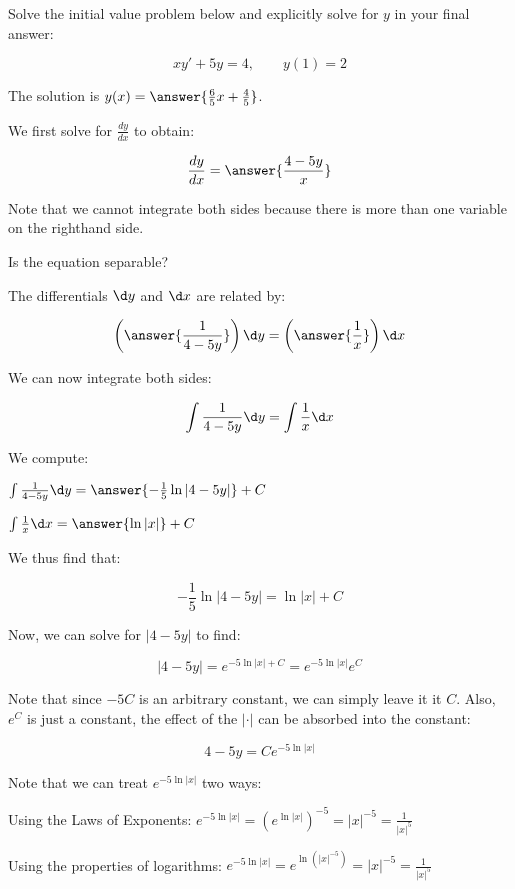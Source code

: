 \documentclass{ximera}
\author{Jim Talamo}
\begin{document}
\begin{exercise}
Solve the initial value problem below and explicitly solve for $y$ in your final answer:

\[
x y' +5y =4  , \qquad y(1)=2
\]

The solution is $y(x) = \answer{ \frac{6}{5}x+\frac{4}{5} }$.

\begin{hint}
We first solve for $\frac{dy}{dx}$ to obtain:

\[
\frac{dy}{dx} = \answer{\frac{4-5y}{x}}
\]

Note that we cannot integrate both sides because there is more than one variable on the righthand side.  

Is the equation separable?
\begin{multipleChoice}
\end{multipleChoice}

The differentials $\d y$ and $\d x$ are related by:

\[
\left(\answer{\frac{1}{4-5y}} \right) \d y = \left(\answer{ \frac{1}{x} } \right) \d x
\]

\begin{question}
We can now integrate both sides:

\[
\int \frac{1}{4-5y} \d y =  \int \frac{1}{x} \d x
\]

We compute:

$\int \frac{1}{4-5y} \d y = \answer{-\frac{1}{5}\ln|4-5y|}+C$

$\int \frac{1}{x} \d x = \answer{\ln|x|}+C$

\begin{question}
We thus find that:

\[
-\frac{1}{5} \ln|4-5y|  = \ln|x| + C
\]

Now, we can solve for $|4-5y|$ to find:

\[
|4-5y| = e^{ -5 \ln|x| + C} = e^{-5 \ln|x|} e^{C} 
\]

Note that since $-5C$ is an arbitrary constant, we can simply leave it it $C$.  Also, $e^{C}$ is just a constant, the effect of the $| \cdot |$ can be absorbed into the constant:

\[
4-5y = Ce^{-5 \ln|x|} 
\]

Note that we can treat $e^{-5 \ln|x|}$ two ways:

Using the Laws of Exponents: $e^{-5 \ln|x|} =\left(e^{ \ln|x|}\right)^{-5} = |x|^{-5} = \frac{1}{|x|^5}$

Using the properties of logarithms: $e^{-5 \ln|x|} = e^{\ln \left(|x|^{-5}\right)} = |x|^{-5} = \frac{1}{|x|^5}$


\end{question}
\end{question}
\end{hint}
\end{exercise}
\end{document}

